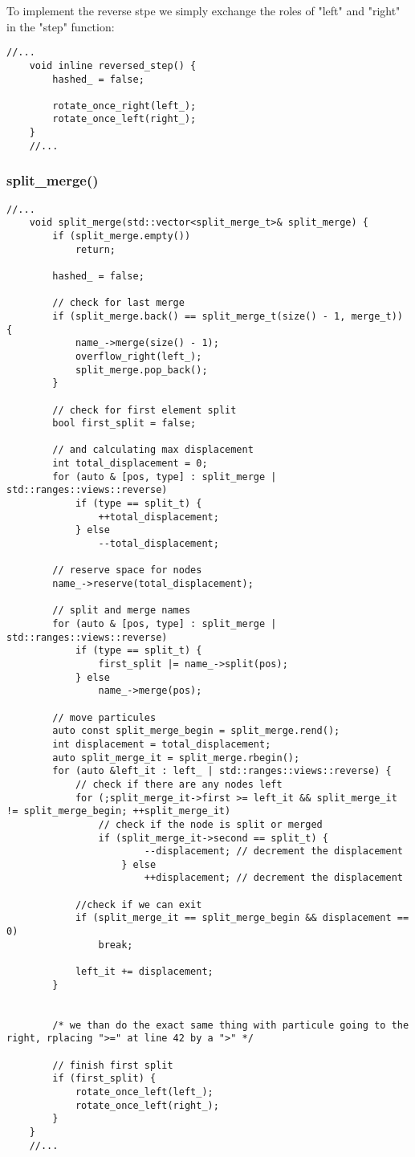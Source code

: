 \documentclass[11pt]{article}
\begin{document}
To implement the reverse stpe we simply exchange the roles of "left" and "right" in the "step" function:

\begin{lstlisting}[style=CStyle]
	//...
  	void inline reversed_step() {
  		hashed_ = false;

  		rotate_once_right(left_);
  		rotate_once_left(right_);
  	}
  	//...
\end{lstlisting}

\subsubsection{split\_merge()}

\begin{lstlisting}[style=CStyle]
	//...
	void split_merge(std::vector<split_merge_t>& split_merge) {
		if (split_merge.empty())
			return;
		
		hashed_ = false;

		// check for last merge
		if (split_merge.back() == split_merge_t(size() - 1, merge_t)) {
			name_->merge(size() - 1);
			overflow_right(left_);	
			split_merge.pop_back();
		}
			
		// check for first element split 
		bool first_split = false;

		// and calculating max displacement 
		int total_displacement = 0;
		for (auto & [pos, type] : split_merge | std::ranges::views::reverse)
			if (type == split_t) {
				++total_displacement;
			} else
				--total_displacement;

		// reserve space for nodes
		name_->reserve(total_displacement);

		// split and merge names
		for (auto & [pos, type] : split_merge | std::ranges::views::reverse)
			if (type == split_t) {
				first_split |= name_->split(pos);
			} else
				name_->merge(pos);

		// move particules
		auto const split_merge_begin = split_merge.rend();
		int displacement = total_displacement;
		auto split_merge_it = split_merge.rbegin();
		for (auto &left_it : left_ | std::ranges::views::reverse) {
			// check if there are any nodes left
			for (;split_merge_it->first >= left_it && split_merge_it != split_merge_begin; ++split_merge_it)
				// check if the node is split or merged
				if (split_merge_it->second == split_t) {
						--displacement; // decrement the displacement 
					} else
						++displacement; // decrement the displacement

			//check if we can exit
			if (split_merge_it == split_merge_begin && displacement == 0)
				break;

			left_it += displacement;
		}
	

		/* we than do the exact same thing with particule going to the right, rplacing ">=" at line 42 by a ">" */
		
		// finish first split 
		if (first_split) {
			rotate_once_left(left_);
			rotate_once_left(right_);
		}
	}
	//...
\end{lstlisting}
\end{document}

